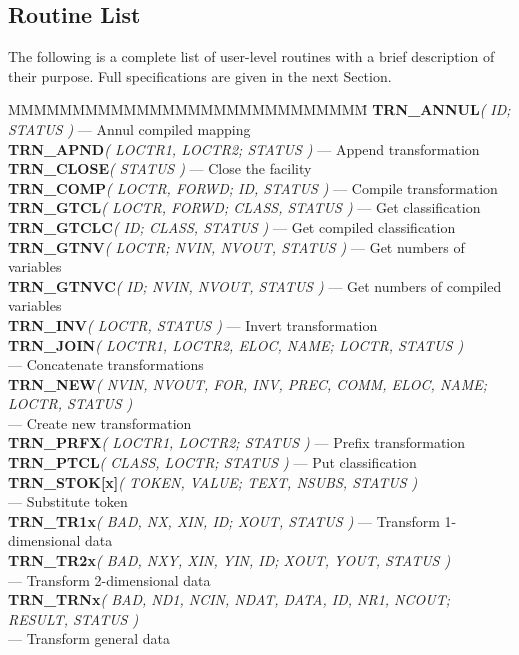 \label{appendix:routines}

\subsection{Routine List}

The following is a complete list of user-level  routines
with a brief description of their purpose.
Full specifications are given in the next Section.

\begin{tabbing}
MMMMMMMMMMMMMMMMMMMMMMMMMMMM\=\kill
{\bf TRN\_ANNUL}{\em ( ID; STATUS )}
\> --- Annul compiled mapping\\[1.6ex]
{\bf TRN\_APND}{\em ( LOCTR1, LOCTR2; STATUS )}
\> --- Append transformation\\[1.6ex]
{\bf TRN\_CLOSE}{\em ( STATUS )}
\> --- Close the  facility\\[1.6ex]
{\bf TRN\_COMP}{\em ( LOCTR, FORWD; ID, STATUS )}
\> --- Compile transformation\\[1.6ex]
{\bf TRN\_GTCL}{\em ( LOCTR, FORWD; CLASS, STATUS )}
\> --- Get classification\\[1.6ex]
{\bf TRN\_GTCLC}{\em ( ID; CLASS, STATUS )}
\> --- Get compiled classification\\[1.6ex]
{\bf TRN\_GTNV}{\em ( LOCTR; NVIN, NVOUT, STATUS )}
\> --- Get numbers of variables\\[1.6ex]
{\bf TRN\_GTNVC}{\em ( ID; NVIN, NVOUT, STATUS )}
\> --- Get numbers of compiled variables\\[1.6ex]
{\bf TRN\_INV}{\em ( LOCTR, STATUS )}
\> --- Invert transformation\\[1.6ex]
{\bf TRN\_JOIN}{\em ( LOCTR1, LOCTR2, ELOC, NAME; LOCTR, STATUS )}\\
\> --- Concatenate transformations\\[1.6ex]
{\bf TRN\_NEW}{\em ( NVIN, NVOUT, FOR, INV, PREC, COMM, ELOC, NAME; LOCTR, 
STATUS )}\\
\> --- Create new transformation\\[1.6ex]
{\bf TRN\_PRFX}{\em ( LOCTR1, LOCTR2; STATUS )}
\> --- Prefix transformation\\[1.6ex]
{\bf TRN\_PTCL}{\em ( CLASS, LOCTR; STATUS )}
\> --- Put classification\\[1.6ex]
{\bf TRN\_STOK[x]}{\em ( TOKEN, VALUE; TEXT, NSUBS, STATUS )}\\
\> --- Substitute token\\[1.6ex]
{\bf TRN\_TR1x}{\em ( BAD, NX, XIN, ID; XOUT, STATUS )}
\> --- Transform 1-dimensional data\\[1.6ex]
{\bf TRN\_TR2x}{\em ( BAD, NXY, XIN, YIN, ID; XOUT, YOUT, STATUS )}\\
\> --- Transform 2-dimensional data\\[1.6ex]
{\bf TRN\_TRNx}{\em ( BAD, ND1, NCIN, NDAT, DATA, ID, NR1, NCOUT; RESULT,
STATUS )}\\
\> --- Transform general data
\end{tabbing}


